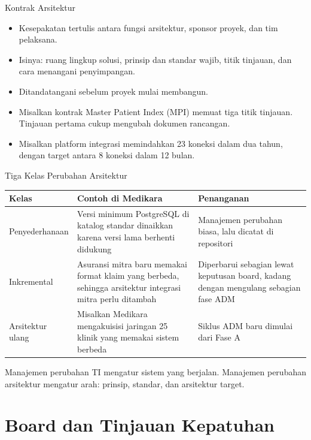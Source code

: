 \documentclass[aspectratio=169, table, 12pt]{beamer}
\begin{document}
\begin{frame}{{\Large Kontrak Arsitektur}}
  \small
  \vspace{4pt}
  \begin{itemize}
    \item Kesepakatan tertulis antara fungsi arsitektur, sponsor proyek, dan tim pelaksana.
    \item Isinya: ruang lingkup solusi, prinsip dan standar wajib, titik tinjauan, dan cara menangani
          penyimpangan.
    \item Ditandatangani sebelum proyek mulai membangun.
    \item Misalkan kontrak Master Patient Index (MPI) memuat tiga titik tinjauan. Tinjauan pertama cukup
          mengubah dokumen rancangan.
    \item Misalkan platform integrasi memindahkan 23 koneksi dalam dua tahun, dengan target antara 8
          koneksi dalam 12 bulan.
  \end{itemize}
\end{frame}

\begin{frame}{{\Large Tiga Kelas Perubahan Arsitektur}}
  \footnotesize
  \begin{tabularx}{\textwidth}{L{2.5cm}YY}
    \hline
    \textbf{Kelas} & \textbf{Contoh di Medikara} & \textbf{Penanganan} \\
    \hline
    Penyederhanaan & Versi minimum PostgreSQL di katalog standar dinaikkan
      karena versi lama berhenti didukung & Manajemen perubahan biasa, lalu
      dicatat di repositori \\
    \hline
    Inkremental & Asuransi mitra baru memakai format klaim yang berbeda,
      sehingga arsitektur integrasi mitra perlu ditambah & Diperbarui
      sebagian lewat keputusan board, kadang dengan mengulang sebagian fase
      ADM \\
    \hline
    Arsitektur ulang & Misalkan Medikara mengakuisisi jaringan 25 klinik
      yang memakai sistem berbeda & Siklus ADM baru dimulai dari Fase A \\
    \hline
  \end{tabularx}

  \vspace{6pt}
  \small Manajemen perubahan TI mengatur sistem yang berjalan. Manajemen perubahan arsitektur mengatur
  arah: prinsip, standar, dan arsitektur target.
\end{frame}

\section{Board dan Tinjauan Kepatuhan}
\end{document}
